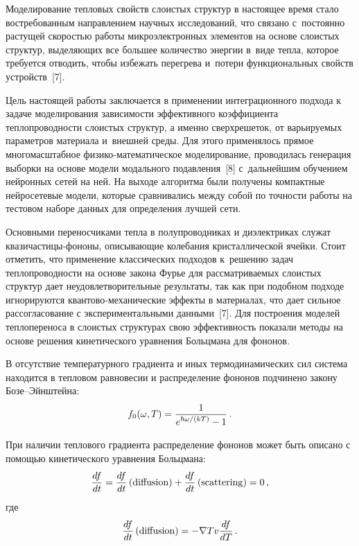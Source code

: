 \begin{multicols}{2}

    Моделирование тепловых свойств слоистых структур в настоящее время 
стало востребованным направлением научных исследований, что связано 
с~постоянно растущей скоростью работы микроэлектронных элементов на основе 
слоистых структур, выделяющих все большее количество энергии в~виде тепла, 
которое требуется отводить, \mbox{чтобы} избежать перегрева и~потери 
функциональных свойств устройств~[7].
     
    Цель настоящей работы заключается в применении интеграционного 
подхода к задаче моделирования зависимости эффективного коэффициента 
теплопроводности слоистых структур, а именно сверхрешеток, от варьируемых 
параметров материала и~внеш\-ней среды. Для этого применялось прямое 
многомасштабное 
 фи\-зи\-ко-ма\-те\-ма\-ти\-че\-ское моделирование, проводилась генерация 
выборки на основе модели модального подавления~[8] с~дальнейшим обучением 
нейронных сетей на ней. На выходе алгоритма были получены компактные 
нейросетевые модели, которые сравнивались между собой по точ\-ности работы 
на тестовом наборе данных для определения лучшей сети.
    
    Основными переносчиками тепла в полупроводниках и диэлектриках 
служат квази\-час\-ти\-цы-фо\-но\-ны, описывающие колебания кристаллической 
ячейки. Стоит отметить, что применение классических подходов к~решению 
задач теплопроводности на основе закона Фурье для рас\-смат\-ри\-ва\-емых слоистых 
структур дает неудовлетворительные результаты, так как  при подобном подходе 
игнорируются  
кван\-то\-во-ме\-ха\-ни\-че\-ские эффекты в материалах, что дает сильное 
рассогласование с экспериментальными данными~[7]. Для построения моделей 
теплопереноса в слоистых структурах свою эффективность показали методы на 
основе решения кинетического уравнения Больцмана для фононов. 

    В отсутствие температурного градиента и иных термодинамических сил 
система находится в тепловом равновесии и распределение фононов подчинено 
закону Бо\-зе--Эйн\-штейна:
\begin{equation*}
f_0(\omega, T)=\displaystyle\frac{\displaystyle 1\mathstrut}{\displaystyle e^{\hbar\omega/(kT)}-1\mathstrut}\,.
\end{equation*}

При наличии 
теплового градиента распределение фононов может быть описано с помощью 
кинетического уравнения Больцмана:
    \begin{equation*}
    \displaystyle\frac{\displaystyle df\mathstrut}{\displaystyle dt\mathstrut}= 
\displaystyle\frac{\displaystyle df\mathstrut}{\displaystyle dt\mathstrut}\left(\mathrm{diffusion}\right)+\displaystyle\frac{\displaystyle df\mathstrut}{\displaystyle dt\mathstrut}\left(\mathrm{scattering}\right)=0\,,
\end{equation*}
где
$$
    \displaystyle\frac{\displaystyle df\mathstrut}{\displaystyle dt\mathstrut}\left( \mathrm{diffusion}\right)= -
\nabla T v \displaystyle\frac{\displaystyle df\mathstrut}{\displaystyle dT\mathstrut}\,.
  $$
    

\end{multicols}
